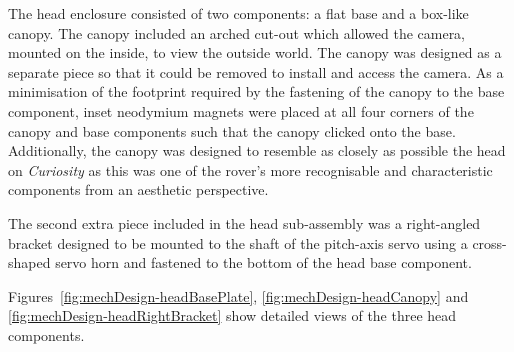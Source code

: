         The head enclosure consisted of two components: a flat base and a box-like canopy. The canopy included an arched cut-out which allowed the camera, mounted on the inside, to view the outside world. The canopy was designed as a separate piece so that it could be removed to install and access the camera. As a minimisation of the footprint required by the fastening of the canopy to the base component, inset neodymium magnets were placed at all four corners of the canopy and base components such that the canopy clicked onto the base. Additionally, the canopy was designed to resemble as closely as possible the head on \textit{Curiosity} as this was one of the rover's more recognisable and characteristic components from an aesthetic perspective.
        
        The second extra piece included in the head sub-assembly was a right-angled bracket designed to be mounted to the shaft of the pitch-axis servo using a cross-shaped servo horn and fastened to the bottom of the head base component.
        
        Figures~\ref{fig:mechDesign-headBasePlate}, \ref{fig:mechDesign-headCanopy} and \ref{fig:mechDesign-headRightBracket} show detailed views of the three head components.

